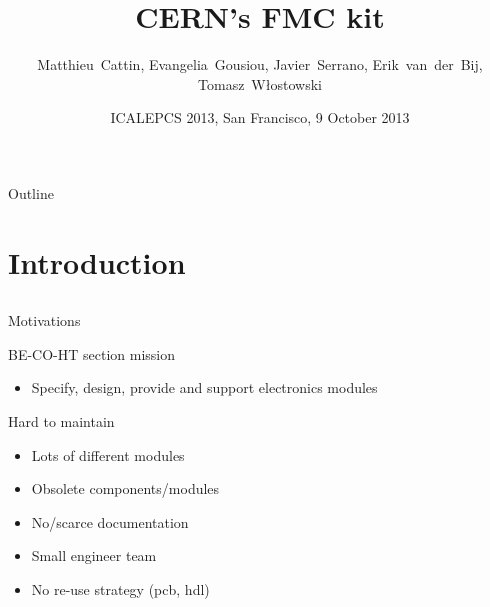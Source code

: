\documentclass[compress,red]{beamer}
\title[CERN's FMC kit] %
{CERN's FMC kit}
\author[Matthieu Cattin] %
{\mbox{Matthieu Cattin}, \mbox{Evangelia Gousiou}, \mbox{Javier Serrano}, \mbox{Erik van der Bij}, \mbox{Tomasz W\l{}ostowski}}
\institute%
{
  CERN, Geneva, Switzerland
 }
\date[ICALEPCS 2013] %
{ICALEPCS 2013, San Francisco, 9 October 2013}
\begin{document}
\begin{frame}
  \titlepage
\end{frame}

\begin{frame}{Outline}
  \tableofcontents
\end{frame}







\section{Introduction}

\subsection*{}

\begin{frame}{Motivations}

  \begin{block}{BE-CO-HT section mission}
    \begin{itemize}
    \item
      Specify, design, provide and support electronics modules
    \end{itemize}
  \end{block}

  \begin{block}{Hard to maintain}
    \begin{itemize}
    \item
      Lots of different modules
    \item
      Obsolete components/modules
    \item
      No/scarce documentation
    \item
      Small engineer team
    \item
      No re-use strategy (pcb, hdl)
    \end{itemize}
  \end{block}

\end{frame}
\end{document}
